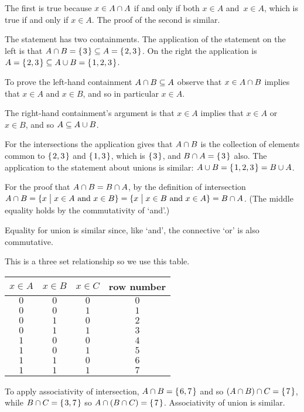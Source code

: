 \documentclass{ibl}  %
\begin{document}
\begin{problem}
\begin{answer}
\begin{items}
  The first is true because
  $x\in A\cap A$ if and only if
  both $x\in A$ and~$x\in A$, 
  which is true if and only if $x\in A$.
  The proof of the second is similar.
\item The statement has two containments.
  The application of the statement on the left is that 
  $A\cap B=\mbox{$\{\hspace{0.1em}3\hspace{0.1em}\}$}\subseteq A=\mbox{$\{\hspace{0.1em}2,3\hspace{0.1em}\}$}$.
  On the right the application is~$A=\mbox{$\{\hspace{0.1em}2,3\hspace{0.1em}\}$}\subseteq A\cup B=\mbox{$\{\hspace{0.1em}1,2,3\hspace{0.1em}\}$}$.

  To prove the left-hand containment $A\cap B\subseteq A$ observe that 
  $x\in A\cap B$ implies that
  $x\in A$ and $x\in B$, and so in particular $x\in A$.

  The right-hand containment's argument is that
  $x\in A$ implies that $x\in A$ or~$x\in B$, and so $A\subseteq A\cup B$.
\item For the intersections the application gives that 
  $A\cap B$ is the collection of elements common to 
  $\mbox{$\{\hspace{0.1em}2,3\hspace{0.1em}\}$}$ and $\mbox{$\{\hspace{0.1em}1,3\hspace{0.1em}\}$}$, which is $\mbox{$\{\hspace{0.1em}3\hspace{0.1em}\}$}$,
  and $B\cap A=\mbox{$\{\hspace{0.1em}3\hspace{0.1em}\}$}$ also.
  The application to the statement about unions is similar: 
  $A\cup B=\mbox{$\{\hspace{0.1em}1,2,3\hspace{0.1em}\}$}=B\cup A$.

  For the proof that
  $A\cap B=B\cap A$,
  by the definition of intersection  
  $A\cap B=\{x \bigm| \text{$x\in A$ and $x\in B$}\}
    =\{x \bigm| \text{$x\in B$ and $x\in A$}\}=B\cap A$.
  (The middle equality holds by the commutativity of `and'.)

  Equality for union is similar since, like `and', the connective
  `or' is also commutative.
\item This is a three set relationship so we use this table.
  \begin{center} \small
    \begin{tabular}{ccc|c}
      $x\in A$  &$x\in B$  &$x\in C$  &row number \\ \hline
         $0$    &$0$       &$0$       &$0$    \\
         $0$    &$0$       &$1$       &$1$    \\
         $0$    &$1$       &$0$       &$2$    \\
         $0$    &$1$       &$1$       &$3$    \\[.5ex] \hline
         $1$    &$0$       &$0$       &$4$    \\
         $1$    &$0$       &$1$       &$5$    \\
         $1$    &$1$       &$0$       &$6$    \\
         $1$    &$1$       &$1$       &$7$    
    \end{tabular}
    \hspace*{3em}
  \end{center}
  To apply associativity of intersection, $A\cap B=\mbox{$\{\hspace{0.1em}6,7\hspace{0.1em}\}$}$ and so
  $(A\cap B)\cap C=\mbox{$\{\hspace{0.1em}7\hspace{0.1em}\}$}$, while
  $B\cap C=\mbox{$\{\hspace{0.1em}3,7\hspace{0.1em}\}$}$ so $A\cap(B\cap C)=\mbox{$\{\hspace{0.1em}7\hspace{0.1em}\}$}$.
  Associativity of union is similar.


\end{items}
\end{answer}
\end{problem}
\end{document}

